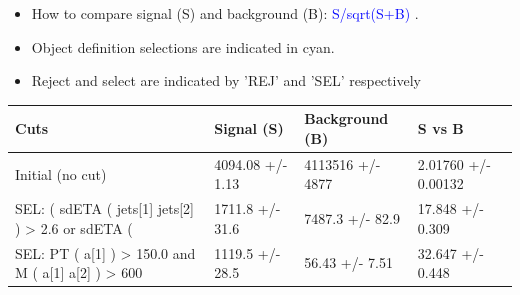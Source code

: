 \documentclass[a4paper, 10pt]{article}
\begin{document}
\begin{itemize}
  \item How to compare signal (S) and background (B): \textcolor{blue}{S/\-sqrt(S+B)} .
   \item Object definition selections are indicated in cyan.  \item Reject and select are indicated by 'REJ' and 'SEL' respectively
\end{itemize}
\begin{table}[H]
  \begin{center}
    \begin{tabular}{|m{36.0mm}|m{36.0mm}|m{36.0mm}|m{33.0mm}|}
      \hline
      {\cellcolor{yellow}        Cuts}& {\cellcolor{yellow}         Signal (S)}& {\cellcolor{yellow}         Background (B)}& {\cellcolor{yellow}         S vs B}\\
      \hline
      {\cellcolor{white}         Initial (no cut)}& {\cellcolor{white}         4094.08 +/\-- 1.13}& {\cellcolor{white}         4113516 +/\-- 4877}& {\cellcolor{white}         2.01760 +/\-- 0.00132}\\
      \hline
      {\cellcolor{white} SEL: ( sdETA ( jets[1] jets[2] ) > 2.6 or sdETA ( }& {\cellcolor{white}         1711.8 +/\-- 31.6}& {\cellcolor{white}         7487.3 +/\-- 82.9}& {\cellcolor{white}         17.848 +/\-- 0.309}\\
      \hline
      {\cellcolor{white} SEL: PT ( a[1] ) > 150.0 and M ( a[1] a[2] ) > 600}& {\cellcolor{white}         1119.5 +/\-- 28.5}& {\cellcolor{white}         56.43 +/\-- 7.51}& {\cellcolor{white}         32.647 +/\-- 0.448}\\
\hline
    \end{tabular}
  \end{center}
\end{table}
\end{document}
